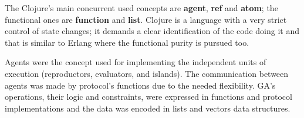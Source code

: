 
The Clojure’s main concurrent used concepts are \textbf{agent}, \textbf{ref} and \textbf{atom}; the functional ones are \textbf{function} and \textbf{list}. Clojure is a language with a very strict control of state changes; it demands a clear identification of the code doing it %
 and that is similar to Erlang where the functional purity is pursued too.

Agents were the concept used for implementing the independent units of execution (reproductors, evaluators, and islands). The communication between agents was made by protocol’s functions due to the needed flexibility. GA’s operations, their logic and constraints, were expressed in functions and protocol implementations and the data was encoded in lists and vectors data structures. 